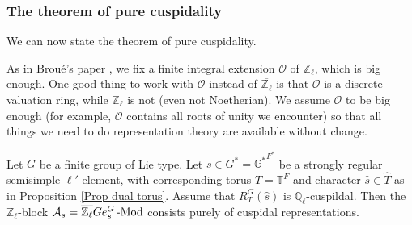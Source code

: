 	
	
	\subsubsection{The theorem of pure cuspidality}
	
	We can now state the theorem of pure cuspidality. 
	
	As in Broué's paper \cite{broue1990isometries}, we fix a finite integral extension $\mathcal{O}$ of $\mathbb{Z}_{\ell}$, which is big enough. One good thing to work with $\mathcal{O}$ instead of $\overline{\mathbb{Z}_{\ell}}$ is that $\mathcal{O}$ is a discrete valuation ring, while $\overline{\mathbb{Z}_{\ell}}$ is not (even not Noetherian). We assume $\mathcal{O}$ to be big enough (for example, $\mathcal{O}$ contains all roots of unity we encounter) so that all things we need to do representation theory are available without change.
	
	\begin{theorem}\label{Pure Cuspidality}
		Let $G$ be a finite group of Lie type. Let $s \in G^*=\mathbb{G^*}^{F^*}$ be a strongly regular semisimple $\ell'$-element, with corresponding torus $T=\mathbb{T}^F$ and character $\hat{s} \in \hat{T}$ as in Proposition \ref{Prop dual torus}. Assume that $R_T^G(\hat{s})$ is $\overline{\mathbb{Q}_{\ell}}$-cuspildal. Then the $\overline{\mathbb{Z}_{\ell}}$-block $\mathcal{A}_s=\overline{\mathbb{Z}_{\ell}}Ge_s^G\operatorname{-Mod}$ consists purely of cuspidal representations.
	\end{theorem}
	
